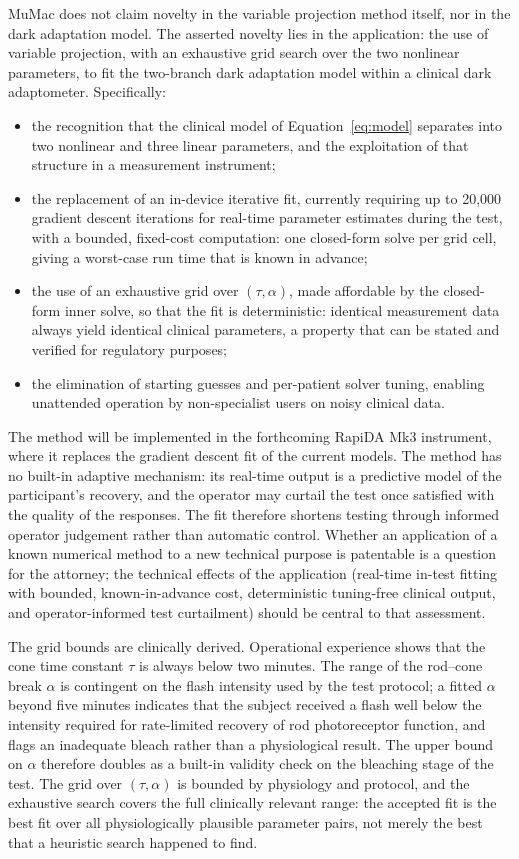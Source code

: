 \documentclass[11pt,a4paper]{article}
\begin{document}
MuMac does not claim novelty in the variable projection method itself, nor
in the dark adaptation model. The asserted novelty lies in the
application: the use of variable projection, with an exhaustive grid
search over the two nonlinear parameters, to fit the two-branch dark
adaptation model within a clinical dark adaptometer. Specifically:
\begin{itemize}[nosep]
\item the recognition that the clinical model of
  Equation~\eqref{eq:model} separates into two nonlinear and three linear
  parameters, and the exploitation of that structure in a measurement
  instrument;
\item the replacement of an in-device iterative fit, currently requiring
  up to 20{,}000 gradient descent iterations for real-time parameter
  estimates during the test, with a bounded, fixed-cost computation:
  one closed-form solve per grid cell, giving a worst-case run time that
  is known in advance;
\item the use of an exhaustive grid over $(\tau,\alpha)$, made affordable
  by the closed-form inner solve, so that the fit is deterministic:
  identical measurement data always yield identical clinical parameters,
  a property that can be stated and verified for regulatory purposes;
\item the elimination of starting guesses and per-patient solver tuning,
  enabling unattended operation by non-specialist users on noisy clinical
  data.
\end{itemize}
The method will be implemented in the forthcoming RapiDA Mk3 instrument,
where it replaces the gradient descent fit of the current models. The
method has no built-in adaptive mechanism: its real-time output is a
predictive model of the participant's recovery, and the operator may
curtail the test once satisfied with the quality of the responses. The
fit therefore shortens testing through informed operator judgement rather
than automatic control.
Whether an application of a known numerical method to a new technical
purpose is patentable is a question for the attorney; the technical
effects of the application (real-time in-test fitting with bounded,
known-in-advance cost, deterministic tuning-free clinical output, and
operator-informed test curtailment) should be central to that assessment.

The grid bounds are clinically derived. Operational experience shows that
the cone time constant $\tau$ is always below two minutes. The range of
the rod--cone break $\alpha$ is contingent on the flash intensity used by
the test protocol; a fitted $\alpha$ beyond five minutes indicates that
the subject received a flash well below the intensity required for
rate-limited recovery of rod photoreceptor function, and flags an
inadequate bleach rather than a physiological result. The upper bound on
$\alpha$ therefore doubles as a built-in validity check on the bleaching
stage of the test. The grid over $(\tau,\alpha)$ is bounded by physiology
and protocol, and the exhaustive search covers the full clinically
relevant range: the accepted fit is the best fit over all physiologically
plausible parameter pairs, not merely the best that a heuristic search
happened to find.
\end{document}
